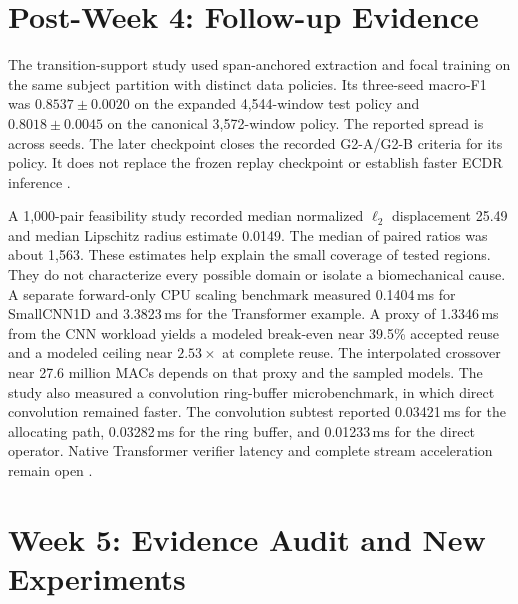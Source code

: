 \documentclass[journal]{IEEEtran}
\begin{document}
\section{Post-Week 4: Follow-up Evidence}
The transition-support study used span-anchored extraction and focal training on the same subject partition with distinct data policies. Its three-seed macro-F1 was $0.8537\pm0.0020$ on the expanded 4,544-window test policy and $0.8018\pm0.0045$ on the canonical 3,572-window policy. The reported spread is across seeds. The later checkpoint closes the recorded G2-A/G2-B criteria for its policy. It does not replace the frozen replay checkpoint or establish faster ECDR inference \cite{localg2}.
\par
A 1,000-pair feasibility study recorded median normalized $\ell_2$ displacement 25.49 and median Lipschitz radius estimate 0.0149. The median of paired ratios was about 1,563. These estimates help explain the small coverage of tested regions. They do not characterize every possible domain or isolate a biomechanical cause. A separate forward-only CPU scaling benchmark measured 0.1404\,ms for SmallCNN1D and 3.3823\,ms for the Transformer example. A proxy of 1.3346\,ms from the CNN workload yields a modeled break-even near 39.5\% accepted reuse and a modeled ceiling near $2.53\times$ at complete reuse. The interpolated crossover near 27.6 million MACs depends on that proxy and the sampled models. The study also measured a convolution ring-buffer microbenchmark, in which direct convolution remained faster. The convolution subtest reported 0.03421\,ms for the allocating path, 0.03282\,ms for the ring buffer, and 0.01233\,ms for the direct operator. Native Transformer verifier latency and complete stream acceleration remain open \cite{localfeasibility}.
\section{Week 5: Evidence Audit and New Experiments}\label{sec:follow-up}
\end{document}
